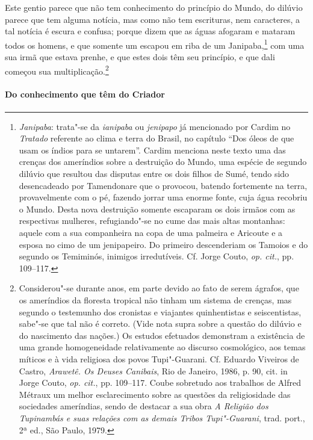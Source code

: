 Este gentio parece que não tem conhecimento do
princípio do Mundo, do dilúvio parece que tem alguma notícia, mas como
não tem escrituras, nem caracteres, a tal notícia é escura e confusa;
porque dizem que as águas afogaram e mataram todos os homens, e que
somente um escapou em riba de um Janipaba,\footnote{ \textit{Janipaba}: 
trata"-se da \textit{ianipaba} ou \textit{jenipapo} já mencionado por
Cardim no \textit{Tratado} referente ao clima e terra do Brasil, no
capítulo ``Dos óleos de que usam os índios para se untarem''. Cardim
menciona neste texto uma das crenças dos ameríndios sobre a destruição
do Mundo, uma espécie de segundo dilúvio que resultou das disputas
entre os dois filhos de Sumé, tendo sido desencadeado por Tamendonare
que o provocou, batendo fortemente na terra, provavelmente com o pé,
fazendo jorrar uma enorme fonte, cuja água recobriu o Mundo. Desta nova
destruição somente escaparam os dois irmãos com as respectivas
mulheres, refugiando"-se no cume das mais altas montanhas: aquele com a
sua companheira na copa de uma palmeira e Aricoute e a esposa no cimo
de um jenipapeiro. Do primeiro descenderiam os Tamoios e do segundo os
Temiminós, inimigos irredutíveis. Cf. Jorge Couto, \textit{op. cit.}, pp. 109--117.} 
com uma sua irmã que estava prenhe, e que estes dois têm
seu princípio, e que dali começou sua multiplicação.\footnote{ Considerou"-se 
durante anos, em parte devido ao fato de serem ágrafos,
que os ameríndios da floresta tropical não tinham um sistema de
crenças, mas segundo o testemunho dos cronistas e viajantes
quinhentistas e seiscentistas, sabe"-se que tal não é correto. (Vide
nota supra sobre a questão do dilúvio e do nascimento das nações.) Os
estudos efetuados demonstram a existência de uma grande homogeneidade
relativamente ao discurso cosmológico, aos temas míticos e à vida
religiosa dos povos Tupi"-Guarani. Cf. Eduardo Viveiros de Castro,
\textit{Arawetê. Os Deuses Canibais}, Rio de Janeiro, 1986, p. 90, cit.
in Jorge Couto, \textit{op. cit.}, pp. 109--117. Coube sobretudo aos
trabalhos de Alfred Métraux um melhor esclarecimento sobre as questões
da religiosidade das sociedades ameríndias, sendo de destacar a sua
obra \textit{A Religião dos Tupinambás e suas relações com as demais
Tribos Tupi"-Guarani}, trad. port., 2ª ed., São Paulo, 1979.} 

\paragraph{Do conhecimento que têm do Criador}


